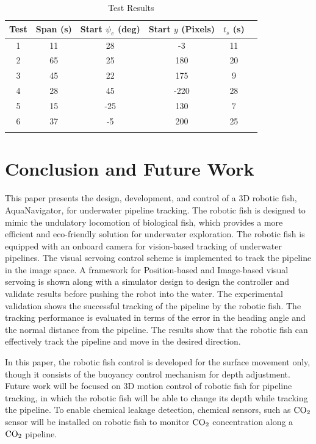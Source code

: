 \documentclass[pdflatex,sn-mathphys-num]{sn-jnl}
\theoremstyle{thmstyleone}%
\begin{document}
\begin{table}[h]
    \centering
    \begin{tabular}[width=\linewidth]{cccccc}
        \toprule
        Test & Span (s) & Start $\psi_e$ (deg) & Start $y$ (Pixels) & $t_s$ (s) \\
        \midrule
        1  & 11 & 28 & -3 & 11 \\
        2  & 65 & 25 & 180 & 20 \\
        3  & 45 & 22 & 175 & 9 \\
        4  & 28 & 45 & -220 & 28 \\
        5  & 15 & -25 & 130 & 7 \\
        6  & 37 & -5 & 200 & 25 \\
        \bottomrule
        \vspace{1em}
    \end{tabular}
    \caption{Test Results}
    \label{tab:test_results}
\end{table}
\section{Conclusion and Future Work}\label{conclusion}
This paper presents the design, development, and control of a 3D robotic fish, AquaNavigator, for underwater pipeline tracking. The robotic fish is designed to mimic the undulatory locomotion of biological fish, which provides a more efficient and eco-friendly solution for underwater exploration. The robotic fish is equipped with an onboard camera for vision-based tracking of underwater pipelines. The visual servoing control scheme is implemented to track the pipeline in the image space. A framework for Position-based and Image-based visual servoing is shown along with a simulator design to design the controller and validate results before pushing the robot into the water. The experimental validation shows the successful tracking of the pipeline by the robotic fish. The tracking performance is evaluated in terms of the error in the heading angle and the normal distance from the pipeline. The results show that the robotic fish can effectively track the pipeline and move in the desired direction.
\par In this paper, the robotic fish control is developed for the surface movement only, though it consists of the buoyancy control mechanism for depth adjustment. Future work will be focused on 3D motion control of robotic fish for pipeline tracking, in which the robotic fish will be able to change its depth while tracking the pipeline. To enable chemical leakage detection, chemical sensors, such as ${\rm CO_2}$ sensor will be installed on robotic fish to monitor ${\rm CO_2}$ concentration along a ${\rm CO_2}$ pipeline.
\end{document}
